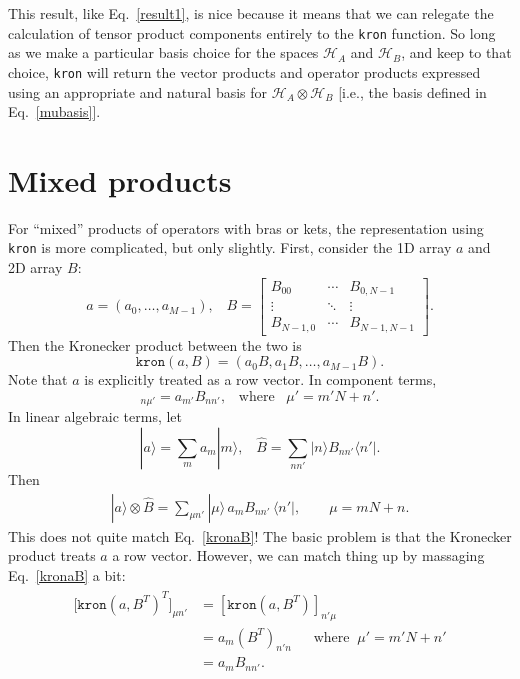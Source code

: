 \documentclass[pra,12pt]{revtex4}
\begin{document}
This result, like Eq.~\eqref{result1}, is nice because it means that
we can relegate the calculation of tensor product components entirely
to the \texttt{kron} function.  So long as we make a particular basis
choice for the spaces $\mathscr{H}_A$ and $\mathscr{H}_B$, and keep to
that choice, \texttt{kron} will return the vector products and
operator products expressed using an appropriate and natural basis for
$\mathscr{H}_A\otimes\mathscr{H}_B$ [i.e., the basis defined in
  Eq.~\eqref{mubasis}].

\section{Mixed products}

For ``mixed'' products of operators with bras or kets, the
representation using \texttt{kron} is more complicated, but only
slightly.  First, consider the 1D array $a$ and 2D array $B$:
\begin{equation}
  a = (a_0, \dots, a_{M-1}), \;\;\;
  B = \begin{bmatrix}B_{00} & \cdots & B_{0,N-1} \\ \vdots & \ddots & \vdots \\  B_{N-1,0} & \cdots & B_{N-1,N-1} \end{bmatrix}.
\end{equation}
Then the Kronecker product between the two is
\begin{equation}
  \texttt{kron}(a, B) = (a_0 B, a_1 B, \dots, a_{M-1} B).
\end{equation}
Note that $a$ is explicitly treated as a row vector.  In component
terms,
\begin{equation}
  [\texttt{kron}(a, B)]_{n\mu'} = a_{m'} B_{nn'}, \;\;\;\mathrm{where}\;\;\;
  \mu' = m'N+n'.
  \label{kronaB}
\end{equation}
In linear algebraic terms, let
\begin{equation}
  |a\rangle = \sum_m a_m |m\rangle, \;\;\; \hat{B} = \sum_{nn'}
  |n\rangle B_{nn'} \langle n'|.
\end{equation}
Then
\begin{align}
  |a\rangle \otimes \hat{B} = \sum_{\mu n'} |\mu\rangle \,
  a_m B_{nn'} \, \langle n'|, \qquad \mu = mN + n.
  \label{aBprod}
\end{align}
This does not quite match Eq.~\eqref{kronaB}!  The basic problem is
that the Kronecker product treats $a$ a row vector.  However, we can
match thing up by massaging Eq.~\eqref{kronaB} a bit:
\begin{align}
  \begin{aligned}
    \left.[\right.\texttt{kron}(a, B^T)^T]_{\mu n'} &=
    [\texttt{kron}(a, B^T)]_{n' \mu} \\
    &= a_{m} (B^T)_{n'n} \quad\;\;\mathrm{where}\;\; \mu' = m'N + n' \\
    &= a_{m} B_{nn'}.
  \end{aligned}
\end{align}
\end{document}
